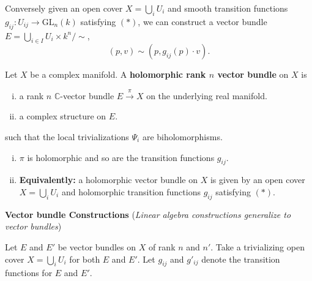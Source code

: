 \documentclass{article}
\begin{document}
Conversely given an open cover $X = \bigcup_i U_i$ and smooth transition functions $g_{ij}: U_{ij} \to \mathrm{GL}_n(k)$ satisfying $(*)$, we can construct a vector bundle $E = \bigcup_{i \in I} U_i \times k^n / \sim$,
$$(p, v) \sim (p, g_{ij}(p) \cdot v).$$

\begin{definition}
Let $X$ be a complex manifold. A \textbf{holomorphic rank $n$ vector bundle} on $X$ is
\begin{enumerate}[(i)]
    \item a rank $n$ $\mathbb{C}$-vector bundle $E \xrightarrow{\pi} X$ on the underlying real manifold.
    \item a complex structure on $E$.
\end{enumerate}
such that the local trivializations $\Psi_i$ are biholomorphisms.
\end{definition}

\begin{remark}
\begin{enumerate}[(i)]
    \item $\pi$ is holomorphic and so are the transition functions $g_{ij}$.
    \item \textbf{Equivalently:} a holomorphic vector bundle on $X$ is given by an open cover $X = \bigcup_i U_i$ and holomorphic transition functions $g_{ij}$ satisfying $(*)$.
\end{enumerate}
\end{remark}

\textbf{Vector bundle Constructions} (\textit{Linear algebra constructions generalize to vector bundles})

Let $E$ and $E'$ be vector bundles on $X$ of rank $n$ and $n'$.
Take a trivializing open cover $X = \bigcup_i U_i$ for both $E$ and $E'$.
Let $g_{ij}$ and $g'_{ij}$ denote the transition functions for $E$ and $E'$.
\end{document}
